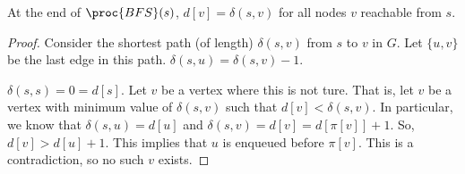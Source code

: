 \begin{theorem}
    At the end of $\proc{BFS}(s)$, $d[v] = \delta(s,v)$ for all nodes $v$ reachable from $s$.
\end{theorem}

\begin{proof}
    Consider the shortest path (of length) $\delta(s,v)$ from $s$ to $v$ in $G$. Let $\{u,v\}$ be the last edge in this path. $\delta(s,u) = \delta(s,v) - 1$.

    $\delta(s,s) = 0 = d[s]$. Let $v$ be a vertex where this is not ture. That is, let $v$ be a vertex with minimum value of $\delta(s,v)$ such that $d[v] < \delta(s,v)$. In particular, we know that $\delta(s,u) = d[u]$ and $\delta(s,v) = d[v] = d[\pi[v]]+1$. So, $d[v] > d[u] + 1$. This implies that $u$ is enqueued before $\pi[v]$. This is a contradiction, so no such $v$ exists.
\end{proof}
